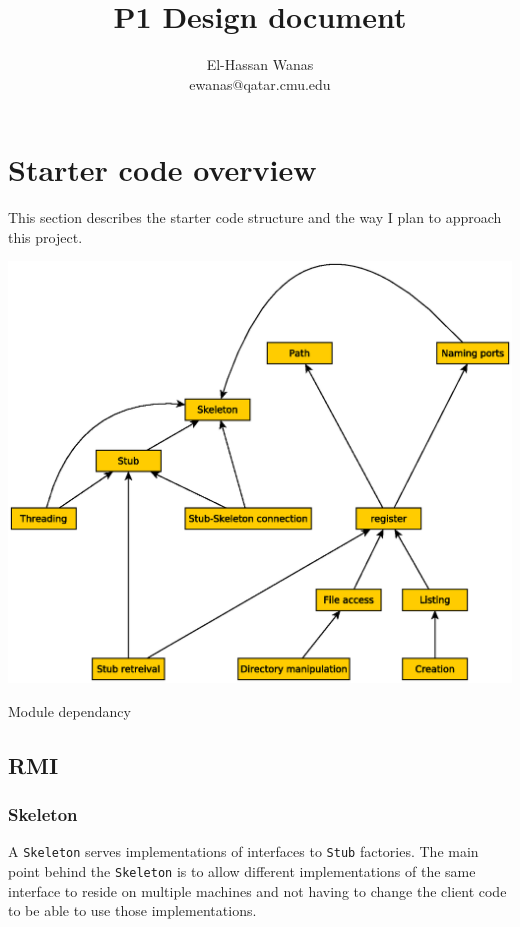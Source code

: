 \documentclass [10pt, a4paper]{article}
\title {P1 Design document}
\author {El-Hassan Wanas\\ewanas@qatar.cmu.edu}
\begin{document}
\maketitle

\section {Starter code overview}
This section describes the starter code structure and the way I plan to approach
this project.

\begin {diagram}
\begin {center}
\includegraphics[scale=0.6]{sequence.eps}
\end {center}
\caption {Module dependancy}
\end {diagram}

\subsection {RMI}
\subsubsection {Skeleton}
A \texttt{Skeleton} serves implementations of interfaces to \texttt{Stub}
factories. The main point behind the \texttt{Skeleton} is to allow different
implementations of
the same interface to reside on multiple machines and not having to change the
client code to be able to use those implementations.
\end{document}
